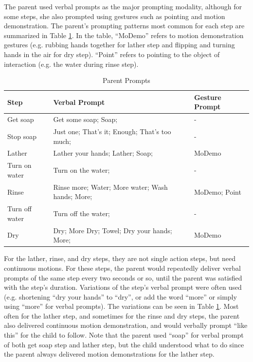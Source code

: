 \documentclass{ut-thesis}
\begin{document}
The parent used verbal prompts as the major prompting modality, although for some steps, she also prompted using gestures such as pointing and motion demonstration.  The parent's prompting patterns most common for each step are summarized in Table \ref{tab:ParentPrompts}.  In the table, ``MoDemo'' refers to motion demonstration gestures (e.g. rubbing hands together for lather step and flipping and turning hands in the air for dry step).  ``Point'' refers to pointing to the object of interaction (e.g. the water during rinse step).

\begin{table}[H]
	\centering
	\begin{tabular}{ | l | l | l | }
		\hline
		\textbf{Step}	&	\textbf{Verbal Prompt} & \textbf{Gesture Prompt}	\\	\hline	\hline

		Get soap	&	Get some soap; Soap;	&	- 	\\	\hline
		Stop soap	&	Just one; That's it; Enough; That's too much;	&	-	\\ \hline
		Lather	&	Lather your hands; Lather; Soap;	& MoDemo	\\	\hline
		Turn on water	&	Turn on the water;	&	-	\\	\hline
		Rinse	&	Rinse more; Water; More water; Wash hands; More;	&	MoDemo; Point	\\	\hline
		Turn off water	&	Turn off the water;	&	-	\\	\hline
		Dry	&	Dry; More Dry; Towel; Dry your hands; More;	&	MoDemo	\\	\hline

	\end{tabular}
	\caption{Parent Prompts}
	\label{tab:ParentPrompts}
\end{table}

For the lather, rinse, and dry steps, they are not single action steps, but need continuous motions.  For these steps, the parent would repeatedly deliver verbal prompts of the same step every two seconds or so, until the parent was satisfied with the step's duration.  Variations of the step's verbal prompt were often used (e.g. shortening ``dry your hands'' to ``dry'', or add the word ``more'' or simply using ``more'' for verbal prompts).  The variations can be seen in Table \ref{tab:ParentPrompts}.  Most often for the lather step, and sometimes for the rinse and dry steps, the parent also delivered continuous motion demonstration, and would verbally prompt ``like this'' for the child to follow.  Note that the parent used ``soap'' for verbal prompt of both get soap step and lather step, but the child understood what to do since the parent always delivered motion demonstrations for the lather step.
\end{document}
